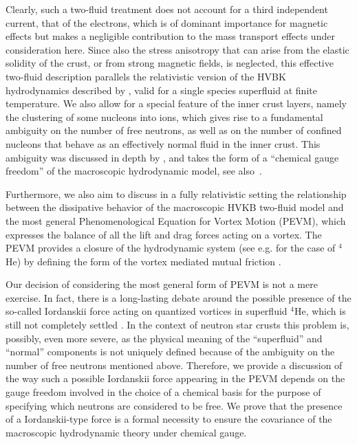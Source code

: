 \documentclass[preprints,article,accept,moreauthors,pdftex]{mdpi}
\begin{document}
Clearly, such a two-fluid treatment does not account for a third independent current,
that of the electrons, which is of dominant importance for magnetic effects but makes a negligible contribution to the mass transport effects under consideration here. 
Since also the  stress anisotropy that can arise from the elastic solidity of the crust, or from strong magnetic fields, is neglected, this effective two-fluid description parallels the relativistic version of the HVBK  hydrodynamics described by \citet{GusakovHVBK}, valid for a single species superfluid at finite temperature. We also allow for a special feature of the inner crust layers, namely the clustering of some nucleons into ions, which gives rise to a fundamental ambiguity on the number of free neutrons, as well as on the number of confined nucleons that behave as an effectively normal fluid in the  inner crust. This ambiguity was discussed in depth by \citet{carter_macro_2006}, and takes the form of a ``chemical gauge freedom'' of the macroscopic hydrodynamic model, see also~\cite{Termo}.

Furthermore, we also aim to discuss in a fully relativistic setting the relationship between the dissipative behavior of the  macroscopic HVKB two-fluid model and the most general Phenomenological Equation for Vortex Motion (PEVM), which expresses the balance of all the lift and drag forces acting on a vortex. The PEVM provides a closure of the hydrodynamic system (see e.g. \cite{Galantucci2020EPJP} for the case of $^4$He) by defining  the form of the vortex mediated mutual friction \cite{andersson_sidery_2006,sourie_corepinn_2020MNRAS,antonelli2020MNRAS}.

Our decision of considering the most general form of PEVM is not a mere exercise. In fact, there is a long-lasting debate around the possible presence of the so-called Iordanskii force acting on quantized vortices in superfluid $^4$He, which is still not completely settled 
\cite{Wexler1997,Sonin_comment_1998,Volovik1998pc,geller2000,stone2000,Thouless2001,sourie2020IJMPB}. 
In the context of neutron star crusts this problem is, possibly, even more severe, as the physical meaning of the ``superfluid'' and ``normal'' components is not uniquely defined because of the ambiguity on the number of free neutrons mentioned above.
Therefore, we provide a discussion of the way such a possible Iordanskii force appearing in the PEVM depends on the gauge freedom involved in the choice of a chemical basis for the purpose of specifying which neutrons are considered to be free. 
We prove that the presence of a Iordanskii-type force is a formal necessity to ensure the covariance of the macroscopic hydrodynamic theory under chemical gauge. 
 
\end{document}
